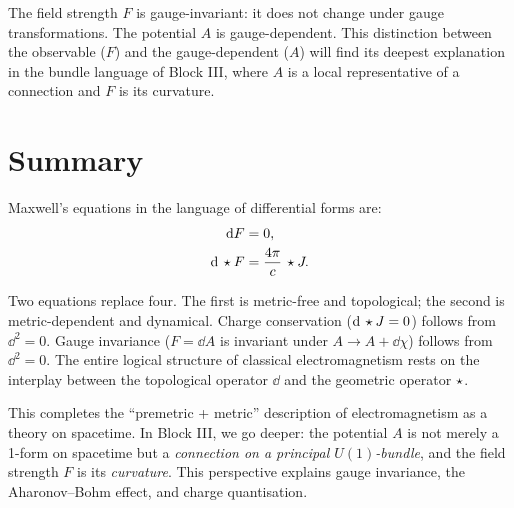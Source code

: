 The field strength $F$ is gauge-invariant: it does not change under gauge transformations. The potential $A$ is gauge-dependent. This distinction between the observable ($F$) and the gauge-dependent ($A$) will find its deepest explanation in the bundle language of Block III, where $A$ is a local representative of a connection and $F$ is its curvature.

\section{Summary}

Maxwell's equations in the language of differential forms are:
\begin{align}
\mathrm{d} F &= 0, \\
\mathrm{d}\,\star F &= \frac{4\pi}{c}\,\star J.
\end{align}

Two equations replace four. The first is metric-free and topological; the second is metric-dependent and dynamical. Charge conservation ($\mathrm{d}\,\star J = 0$) follows from $\dd^2 = 0$. Gauge invariance ($F = \dd A$ is invariant under $A \to A + \dd\chi$) follows from $\dd^2 = 0$. The entire logical structure of classical electromagnetism rests on the interplay between the topological operator $\dd$ and the geometric operator $\star$.

This completes the ``premetric + metric'' description of electromagnetism as a theory on spacetime. In Block III, we go deeper: the potential $A$ is not merely a 1-form on spacetime but a \emph{connection on a principal $U(1)$-bundle}, and the field strength $F$ is its \emph{curvature}. This perspective explains gauge invariance, the Aharonov--Bohm effect, and charge quantisation.
